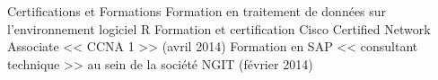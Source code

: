 \begin{rubric}{Certifications et Formations}
\entry*[]	 Formation en traitement de données sur l'environnement logiciel R
\entry*[]	 Formation et certification Cisco Certified Network Associate << CCNA 1 >> (avril 2014) %
\entry*[]	 Formation en SAP << consultant technique >> au sein de la société NGIT (février 2014) %
\end{rubric}
